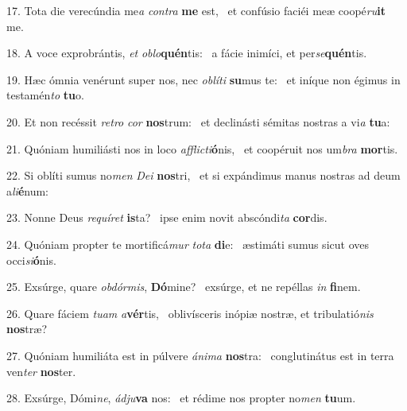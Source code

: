 17. Tota die verecúndia me\textit{a} \textit{con}\textit{tra} \textbf{me} est, \ast\  et confúsio faciéi meæ coopé\textit{ru}\textbf{it} me.\

18. A voce exprobrántis, \textit{et} \textit{ob}\textit{lo}\textbf{quén}tis: \ast\  a fácie inimíci, et per\textit{se}\textbf{quén}tis.\

19. Hæc ómnia venérunt super nos, nec \textit{ob}\textit{lí}\textit{ti} \textbf{su}mus te: \ast\  et iníque non égimus in testamén\textit{to} \textbf{tu}o.\

20. Et non recéssit \textit{re}\textit{tro} \textit{cor} \textbf{nos}trum: \ast\  et declinásti sémitas nostras a vi\textit{a} \textbf{tu}a:\

21. Quóniam humiliásti nos in loco \textit{af}\textit{flic}\textit{ti}\textbf{ó}nis, \ast\  et coopéruit nos um\textit{bra} \textbf{mor}tis.\

22. Si oblíti sumus no\textit{men} \textit{De}\textit{i} \textbf{nos}tri, \ast\  et si expándimus manus nostras ad deum a\textit{li}\textbf{é}num:\

23. Nonne Deus \textit{re}\textit{quí}\textit{ret} \textbf{is}ta? \ast\  ipse enim novit abscóndi\textit{ta} \textbf{cor}dis.\

24. Quóniam propter te mortificá\textit{mur} \textit{to}\textit{ta} \textbf{di}e: \ast\  æstimáti sumus sicut oves occi\textit{si}\textbf{ó}nis.\

25. Exsúrge, quare \textit{ob}\textit{dór}\textit{mis}, \textbf{Dó}mine? \ast\  exsúrge, et ne repéllas \textit{in} \textbf{fi}nem.\

26. Quare fáciem \textit{tu}\textit{am} \textit{a}\textbf{vér}tis, \ast\  oblivísceris inópiæ nostræ, et tribulatió\textit{nis} \textbf{nos}træ?\

27. Quóniam humiliáta est in púlvere \textit{á}\textit{ni}\textit{ma} \textbf{nos}tra: \ast\  conglutinátus est in terra ven\textit{ter} \textbf{nos}ter.\

28. Exsúrge, Dómi\textit{ne}, \textit{ád}\textit{ju}\textbf{va} nos: \ast\  et rédime nos propter no\textit{men} \textbf{tu}um.\

